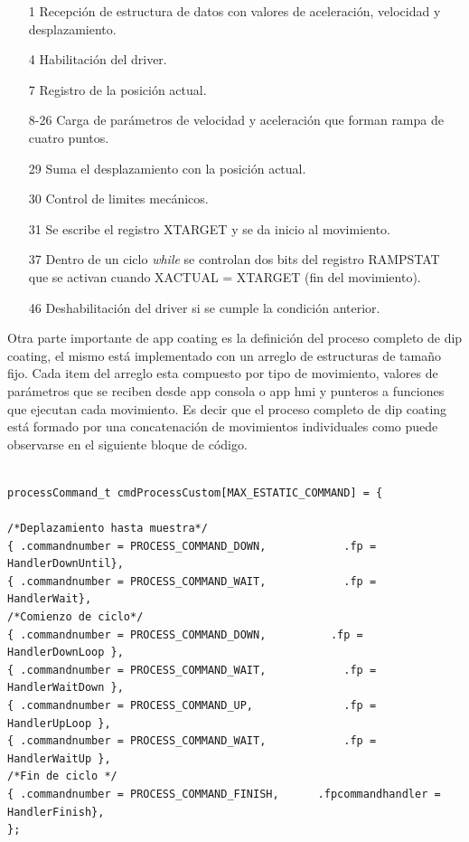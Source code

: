 \begin{itemize}
\item [1] Recepción de estructura de datos con valores de aceleración, velocidad y desplazamiento.
\item [4] Habilitación del driver.
\item [7] Registro de la posición actual.
\item [8-26] Carga de parámetros de velocidad y aceleración que forman rampa de cuatro puntos.
\item [29] Suma el desplazamiento con la posición actual.
\item [30] Control de limites mecánicos.
\item [31] Se escribe el registro XTARGET y se da inicio al movimiento.
\item [37] Dentro de un ciclo \textit{while} se controlan dos bits del registro RAMPSTAT que se activan cuando XACTUAL = XTARGET (fin del movimiento).
\item [46] Deshabilitación del driver si se cumple la condición anterior.  
\end{itemize}


Otra parte importante de app coating es la definición del proceso completo de dip coating, el mismo está implementado con un arreglo de estructuras de tamaño fijo. Cada item del arreglo esta compuesto por tipo de movimiento, valores de parámetros que se reciben desde app consola o app hmi y punteros a funciones que ejecutan cada movimiento. Es decir que el proceso completo de dip coating está formado por una concatenación de movimientos individuales como puede observarse en el siguiente bloque de código.

\begin{lstlisting}[label=cod:vDownCode,caption=Proceso completo de dip coating.] % 

processCommand_t cmdProcessCustom[MAX_ESTATIC_COMMAND] = {

/*Deplazamiento hasta muestra*/
{ .commandnumber = PROCESS_COMMAND_DOWN, 		 	.fp = HandlerDownUntil},
{ .commandnumber = PROCESS_COMMAND_WAIT, 			.fp = HandlerWait},
/*Comienzo de ciclo*/
{ .commandnumber = PROCESS_COMMAND_DOWN, 		  .fp = HandlerDownLoop },
{ .commandnumber = PROCESS_COMMAND_WAIT, 			.fp = HandlerWaitDown },
{ .commandnumber = PROCESS_COMMAND_UP, 			 	.fp = HandlerUpLoop },
{ .commandnumber = PROCESS_COMMAND_WAIT, 			.fp = HandlerWaitUp },
/*Fin de ciclo */
{ .commandnumber = PROCESS_COMMAND_FINISH,		.fpcommandhandler = HandlerFinish},
}; 

\end{lstlisting}

